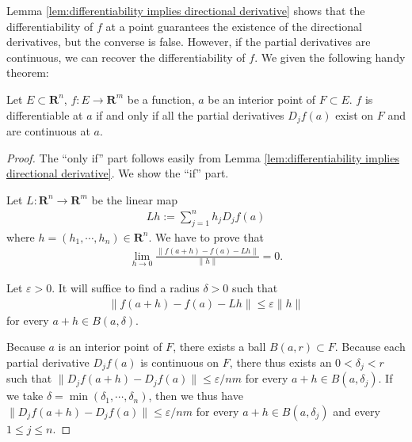 Lemma \ref{lem:differentiability implies directional derivative} shows that the differentiability of $f$ at a point guarantees the existence of the directional derivatives, but the converse is false. However, if the partial derivatives are continuous, we can recover the differentiability of $f$. We given the following handy theorem:

\begin{theorem}
    Let $E \subset \mathbf{R}^n$, $f : E \to \mathbf{R}^m$ be a function, $a$ be an interior point of $F \subset E$. $f$ is differentiable at $a$ if and only if all the partial derivatives $D_jf(a)$ exist on $F$ and are continuous at $a$.
\end{theorem}

\begin{proof}
    The ``only if'' part follows easily from Lemma \ref{lem:differentiability implies directional derivative}. We show the ``if'' part.

    Let $L : \mathbf{R}^n \to \mathbf{R}^m$ be the linear map
        \begin{align*}
            Lh := \sum_{j = 1}^{n}h_jD_jf(a)
        \end{align*}
where $h = (h_1, \cdots, h_n) \in \mathbf{R}^n$. We have to prove that
        \begin{align*}
            \lim_{h \to 0}\frac{\|f(a + h) - f(a) - Lh\|}{\|h\|} = 0.
        \end{align*}

    Let $\varepsilon > 0$. It will suffice to find a radius $\delta > 0$ such that
        \begin{align*}
            \|f(a + h) - f(a) - Lh\| \leq \varepsilon \|h\|
        \end{align*}
for every $a + h \in B(a, \delta)$.

    Because $a$ is an interior point of $F$, there exists a ball $B(a, r) \subset F$. Because each partial derivative $D_jf(a)$ is continuous on $F$, there thus exists an $0 < \delta_j < r$ such that $\|D_jf(a + h) - D_jf(a)\| \leq \varepsilon/nm$ for every $a + h \in B(a, \delta_j)$. If we take $\delta = \min(\delta_1, \cdots, \delta_n)$, then we thus have $\|D_jf(a + h) - D_jf(a)\| \leq \varepsilon/nm$ for every $a + h \in B(a, \delta_j)$ and every $1 \leq j \leq n$.


\end{proof}
